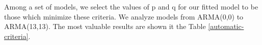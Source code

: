 \documentclass[14pt,a4paper]{extarticle}
\newcounter{e}
\numberwithin{equation}{section}
\numberwithin{figure}{section}
\begin{document}
Among a set of models, we select the values of p and q for our fitted model to be those which minimize these criteria. We analyze models from ARMA(0,0) to ARMA(13,13). The most valuable results are shown it the Table \ref{automatic-criteria}. 

\end{document}
